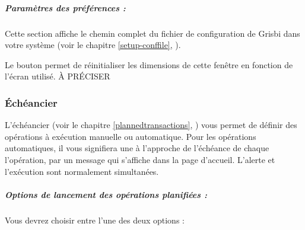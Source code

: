 


\ifIllustration
\fi




\subparagraph{Paramètres des préférences :\label{setup-general-various-general-preferences}}

Cette section affiche le chemin complet du fichier de configuration de Grisbi dans votre système (voir le chapitre \vref{setup-conffile}, ).


Le bouton  permet de réinitialiser les dimensions de cette fenêtre en fonction de l'écran utilisé. À PRÉCISER


\subsubsection{Échéancier\label{setup-general-various-planned}}

L'échéancier (voir le chapitre \vref{plannedtransactions}, ) vous permet de définir des opérations à exécution manuelle ou automatique. Pour les opérations automatiques, il vous signifiera une  à l'approche de l'échéance de chaque l'opération, par un message qui s'affiche dans la page d'accueil. L'alerte et l'exécution sont normalement simultanées.

\subparagraph{Options de lancement des opérations planifiées :\label{setup-general-various-planned-options}}

Vous devrez choisir entre l'une des deux options :

